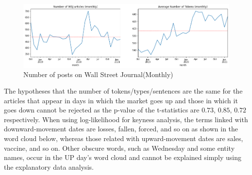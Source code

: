 \documentclass[a4paper, 12pt]{report}
\begin{document}
    
    \begin{figure}[H]
    \includegraphics[width=15cm]{graphs/line_tokens.png}
    \centering
    \caption{Number of posts on Wall Street Journal(Monthly)}
    \label{Fig:number of articles}
    \end{figure}
    
    
    The hypotheses that the number of tokens/types/sentences are the same for the articles that appear in days in which the market goes up and those in which it goes down cannot be rejected as the p-value of the t-statistics are $0.73$, $0.85$, $0.72$ respectively. When using log-likelihood for keyness analysis, the terms linked with downward-movement dates are losses, fallen, forced, and so on as shown in the word cloud below, whereas those related with upward-movement dates are sales, vaccine, and so on. Other obscure words, such as Wednesday and some entity names, occur in the UP day's word cloud and cannot be explained simply using the explanatory data analysis.
    
\end{document}
